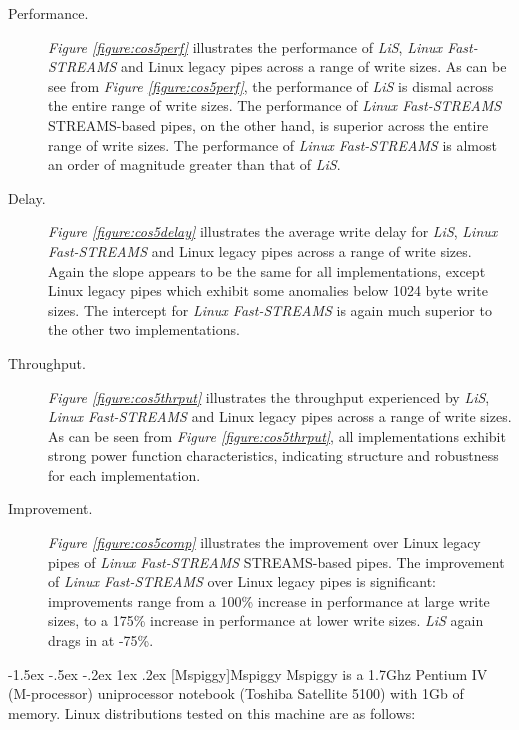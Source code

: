 \documentclass[letterpaper,final,notitlepage,twocolumn,10pt,twoside]{article}
\makeatletter
\renewcommand\subsection{\@startsection{subsection}{2}{\z@}%
                                     {-1.5ex \@plus -.5ex \@minus -.2ex}%
                                     {1ex \@plus .2ex}%
                                     {\normalfont\normalsize\bfseries}}
\makeatother
\begin{document}
\begin{description}

\item[Performance.]

\textit{Figure \ref{figure:cos5perf}} illustrates the performance of
\textsl{LiS}, \textsl{Linux Fast-STREAMS} and Linux legacy pipes across a
range of write sizes.  As can be see from \textit{Figure
\ref{figure:cos5perf}}, the performance of \textsl{LiS} is dismal across the
entire range of write sizes.  The performance of \textsl{Linux Fast-STREAMS}
STREAMS-based pipes, on the other hand, is superior across the entire range of
write sizes.  The performance of \textsl{Linux Fast-STREAMS} is almost an
order of magnitude greater than that of \textsl{LiS}.

\item[Delay.]

\textit{Figure \ref{figure:cos5delay}} illustrates the average write delay for
\textsl{LiS}, \textsl{Linux Fast-STREAMS} and Linux legacy pipes across a
range of write sizes.  Again the slope appears to be the same for all
implementations, except Linux legacy pipes which exhibit some anomalies
below 1024 byte write sizes.  The intercept for \textsl{Linux Fast-STREAMS} is
again much superior to the other two implementations.

\item[Throughput.]

\textit{Figure \ref{figure:cos5thrput}} illustrates the throughput experienced
by \textsl{LiS}, \textsl{Linux Fast-STREAMS} and Linux legacy pipes across a
range of write sizes.  As can be seen from \textit{Figure
\ref{figure:cos5thrput}}, all implementations exhibit strong power function
characteristics, indicating structure and robustness for each implementation.

\item[Improvement.]

\textit{Figure \ref{figure:cos5comp}} illustrates the improvement over Linux
legacy pipes of \textsl{Linux Fast-STREAMS} STREAMS-based pipes.  The
improvement of \textsl{Linux Fast-STREAMS} over Linux legacy pipes is
significant: improvements range from a 100\% increase in performance at large
write sizes, to a 175\% increase in performance at lower write sizes.
\textsl{LiS} again drags in at -75\%.

\end{description}

\subsection[Mspiggy]{Mspiggy}
Mspiggy is a 1.7Ghz Pentium IV (M-processor) uniprocessor notebook (Toshiba
Satellite 5100) with 1Gb of memory.  Linux distributions tested on this
machine are as follows:
\end{document}
